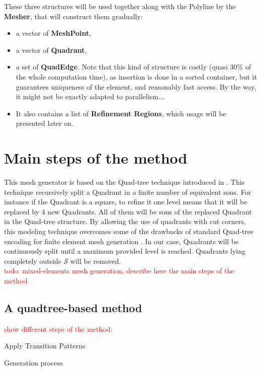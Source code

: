 \documentclass[10pt]{article}
\begin{document}
These three structures will be used together along with the Polyline by the \textbf{Mesher}, that will construct them gradually:
\begin{itemize}
\item a vector of \textbf{MeshPoint},
\item a vector of \textbf{Quadrant},
\item a set of \textbf{QuadEdge}. Note that this kind of structure is costly (quasi 30\% of the whole computation time), as insertion is done in a sorted container, but it guarantees uniqueness of the element, and reasonably fast access. By the way, it might not be exactly adapted to parallelism...
\item It also contains a list of \textbf{Refinement Regions}, which usage will be presented later on.
\end{itemize}

\section{Main steps of the method}
\label{sec:method}
This mesh generator is based on the Quad-tree technique introduced in \cite{Finkel1974}. This technique recursively split a Quadrant in a finite number of equivalent sons. For instance if the Quadrant is a square, to refine it one level means that it will be replaced by 4 new Quadrants. All of them will be sons of the replaced Quadrant in the Quad-tree structure. By allowing the use of quadrants with cut corners, this modeling technique overcomes some of the drawbacks of standard Quad-tree encoding for finite element mesh generation \cite{Yerry1983}.
In our case, Quadrants will be continuously split until a maximum provided level is reached. Quadrants lying completely outside $\mathcal{S}$ will be removed.\\

\textcolor{red}{todo: mixed-elements mesh generation, describe here the main steps of the method}

\subsection{A quadtree-based method}
\textcolor{red}{show different steps of the method: }

\begin{algorithm}[H]
\SetAlgoLined
{}
 \nl  {}
 \nl Apply Transition Patterns\; \label{alg:trans}
 \caption{Generation process}
 \label{alg:generate}
\end{algorithm}
\end{document}
